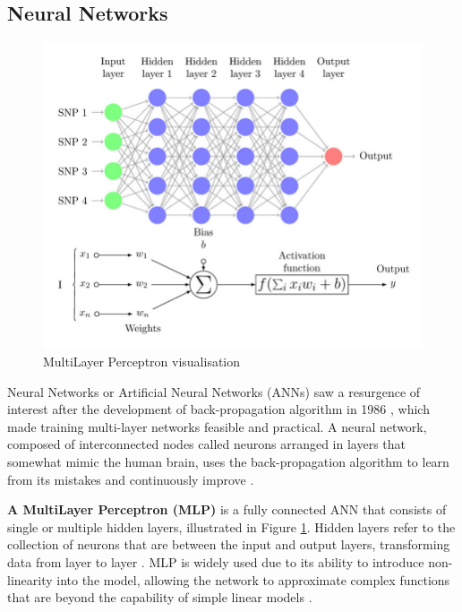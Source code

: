 \subsection{Neural Networks}

\begin{figure}[htbp]
    \centering
    \includegraphics[width=0.9\linewidth]{images/mlp.png}
    \caption{MultiLayer Perceptron visualisation \cite{perez-enciso-2019-guide}}
    \label{fig:mlp}
\end{figure}

Neural Networks or Artificial Neural Networks (ANNs) saw a resurgence of interest after the development of back-propagation algorithm in 1986 \cite{rumelhart-1986-ann}, which made training multi-layer networks feasible and practical. A neural network, composed of interconnected nodes called neurons arranged in layers that somewhat mimic the human brain, uses the back-propagation algorithm to learn from its mistakes and continuously improve \cite{aws-neural-network}.

\textbf{A MultiLayer Perceptron (MLP)} is a fully connected ANN that consists of single or multiple hidden layers, illustrated in Figure \ref{fig:mlp}. Hidden layers refer to the collection of neurons that are between the input and output layers, transforming data from layer to layer \cite{uzair-2020-hidden-layers}. MLP is widely used due to its ability to introduce non-linearity into the model, allowing the network to approximate complex functions that are beyond the capability of simple linear models \cite{popescue-2009-mlp}.


